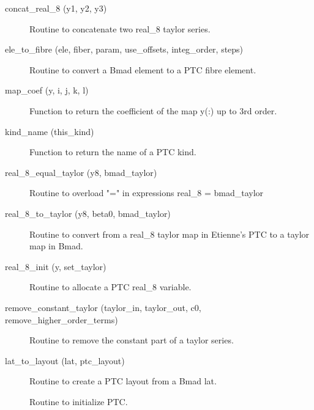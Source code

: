 \begin{description}

\label{r:concat.real.8}
\item[concat_real_8 (y1, y2, y3)] \Newline
Routine to concatenate two real_8 taylor series. 

\label{r:ele.to.fibre}
\item[ele_to_fibre (ele, fiber, param, use_offsets, integ_order, steps)] \Newline
Routine to convert a Bmad element to a PTC fibre element. 

\label{r:map.coef}
\item[map_coef (y, i, j, k, l)] \Newline
Function to return the coefficient of the map y(:) up to 3rd order. 

\label{r:kind.name}
\item[kind_name (this_kind)] \Newline
Function to return the name of a PTC kind. 

\label{r:real.8.equal.taylor}
\item[real_8_equal_taylor (y8, bmad_taylor)] \Newline
Routine to overload "=" in expressions real_8 = bmad_taylor 

\label{r:real.8.to.taylor}
\item[real_8_to_taylor (y8, beta0, bmad_taylor)] \Newline
Routine to convert from a real_8 taylor map in Etienne's PTC to a taylor map in Bmad. 

\label{r:real.8.init}
\item[real_8_init (y, set_taylor)] \Newline
Routine to allocate a PTC real_8 variable. 

\label{r:remove.constant.taylor}
\item[remove_constant_taylor (taylor_in, taylor_out, c0, remove_higher_order_terms)] \Newline
Routine to remove the constant part of a taylor series. 

\label{r:lat.to.layout}
\item[lat_to_layout (lat, ptc_layout)] \Newline
Routine to create a PTC layout from a Bmad lat. 

\label{r:set.ptc}
\item[\protect\parbox{6.5in}{
    set_ptc (e_tot, particle, taylor_order, integ_order, n_step, no_cavity, \\
    \hspace*{1in} exact_calc, exact_misalign) }] \Newline
Routine to initialize PTC. 


\end{description}
